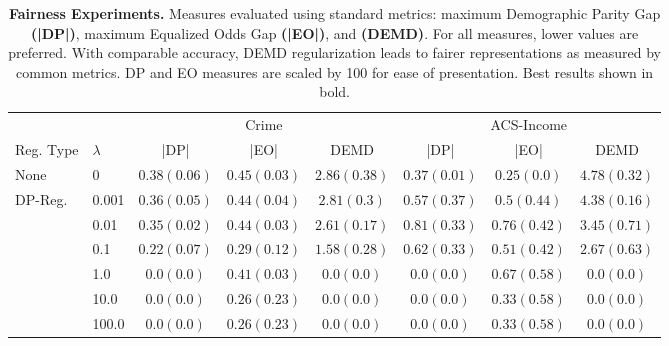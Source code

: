 \begin{table*}
	\scriptsize
	\setlength\tabcolsep{10pt} %
	\caption[Additional DEMD fairness results 2]{\textbf{Fairness Experiments.} Measures evaluated using standard metrics: maximum Demographic Parity Gap \textbf{(|DP|)},  maximum Equalized Odds Gap \textbf{(|EO|)}, and \textbf{(DEMD)}. For all measures, lower values are preferred.  With comparable accuracy, DEMD regularization leads to fairer representations as measured by common metrics. DP and EO measures are scaled by 100 for ease of presentation. Best results shown in bold.}
	\begin{tabular*}{\linewidth}{ll| *{3}{c}|*{3}{c}}
		\midrule%
		& & \multicolumn{3}{c}{Crime} & \multicolumn{3}{c}{ACS-Income} \\
		\cmidrule{3-5} \cmidrule{6-8}
		Reg. Type & $\lambda$ & |DP| & |EO| & DEMD & |DP| & |EO| & DEMD \\ 
		\midrule
		None & 0 & $0.38\scriptscriptstyle(0.06)$ & $0.45\scriptscriptstyle(0.03)$ & $2.86\scriptscriptstyle(0.38)$ & $0.37\scriptscriptstyle(0.01)$ & $0.25\scriptscriptstyle(0.0)$ & $4.78\scriptscriptstyle(0.32)$ \\
\midrule
DP-Reg. & 0.001 & $0.36\scriptscriptstyle(0.05)$ & $0.44\scriptscriptstyle(0.04)$ & $2.81\scriptscriptstyle(0.3)$ & $0.57\scriptscriptstyle(0.37)$ & $0.5\scriptscriptstyle(0.44)$ & $4.38\scriptscriptstyle(0.16)$ \\
	 & 0.01 & $0.35\scriptscriptstyle(0.02)$ & $0.44\scriptscriptstyle(0.03)$ & $2.61\scriptscriptstyle(0.17)$ & $0.81\scriptscriptstyle(0.33)$ & $0.76\scriptscriptstyle(0.42)$ & $3.45\scriptscriptstyle(0.71)$ \\
	 & 0.1 & $0.22\scriptscriptstyle(0.07)$ & $0.29\scriptscriptstyle(0.12)$ & $1.58\scriptscriptstyle(0.28)$ & $0.62\scriptscriptstyle(0.33)$ & $0.51\scriptscriptstyle(0.42)$ & $2.67\scriptscriptstyle(0.63)$ \\
	 & 1.0 & $0.0\scriptscriptstyle(0.0)$ & $0.41\scriptscriptstyle(0.03)$ & $0.0\scriptscriptstyle(0.0)$ & $0.0\scriptscriptstyle(0.0)$ & $0.67\scriptscriptstyle(0.58)$ & $0.0\scriptscriptstyle(0.0)$ \\
	 & 10.0 & $0.0\scriptscriptstyle(0.0)$ & $0.26\scriptscriptstyle(0.23)$ & $0.0\scriptscriptstyle(0.0)$ & $0.0\scriptscriptstyle(0.0)$ & $0.33\scriptscriptstyle(0.58)$ & $0.0\scriptscriptstyle(0.0)$ \\
	 & 100.0 & $0.0\scriptscriptstyle(0.0)$ & $0.26\scriptscriptstyle(0.23)$ & $0.0\scriptscriptstyle(0.0)$ & $0.0\scriptscriptstyle(0.0)$ & $0.33\scriptscriptstyle(0.58)$ & $0.0\scriptscriptstyle(0.0)$ \\

\end{tabular*}
\end{table*}
